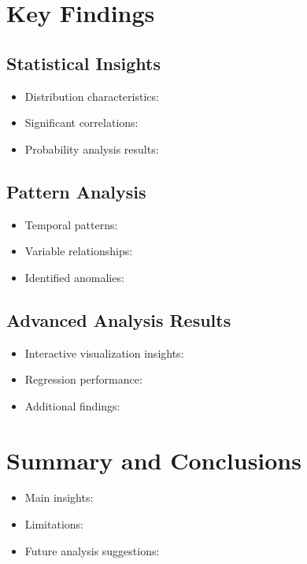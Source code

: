 \documentclass[11pt]{article}
\begin{document}
\section{Key Findings}

\subsection{Statistical Insights}
\begin{itemize}
    \item Distribution characteristics:
    \item Significant correlations:
    \item Probability analysis results:
\end{itemize}

\subsection{Pattern Analysis}
\begin{itemize}
    \item Temporal patterns:
    \item Variable relationships:
    \item Identified anomalies:
\end{itemize}

\subsection{Advanced Analysis Results}
\begin{itemize}
    \item Interactive visualization insights:
    \item Regression performance:
    \item Additional findings:
\end{itemize}

\section{Summary and Conclusions}
\begin{itemize}
    \item Main insights:
    \item Limitations:
    \item Future analysis suggestions:
\end{itemize}

\end{document}
